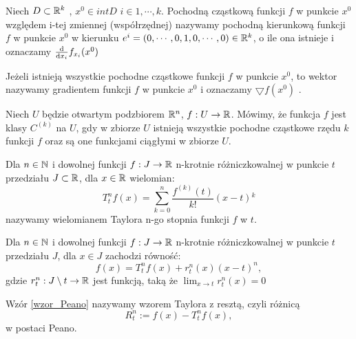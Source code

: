\documentclass[12pt,a4paper]{report}
\begin{document}
\begin{definition}
Niech $D \subset \mathbb{R}^k$ , $x^0 \in intD$ $ i \in {1,\cdots,k}$. Pochodną cząstkową funkcji $f$ w punkcie $x^0$ względem i-tej zmiennej (współrzędnej)  nazywamy pochodną kierunkową funkcji $f$ w punkcie $x^0$ w kierunku $e^i = (0, \cdots, 0, 1, 0, \cdots, 0) \in \mathbb{R}^k$, o ile ona istnieje i oznaczamy $\frac{\mathrm{d} {} }{\mathrm{d}{x_i}}f_{x_{i}}(x^0) $
\end{definition}

\begin{definition}
Jeżeli istnieją wszystkie pochodne cząstkowe funkcji $f$ w punkcie $x^0$, to wektor 
\begin{equation}
[\ddx{x_1}f_{x_{1}}(x_0), \cdots, \ddx{x_k}f_{x_{k}}(x_0)]
\end{equation}
 nazywamy gradientem funkcji $f$ w punkcie $x^0$ i oznaczamy $\bigtriangledown f(x^0)$ .
\end{definition}

\begin{definition}[klasa $C^{(k)}$]
Niech $U$ będzie otwartym podzbiorem $ \mathbb{R}^n $, $ f: U \to \mathbb{R} $. Mówimy, że funkcja $f$ jest klasy $C^{(k)}$ na $U$,  gdy w zbiorze $U$ istnieją wszystkie pochodne cząstkowe rzędu $k$ funkcji $f$ oraz są one funkcjami ciągłymi w zbiorze $U$. 
\end{definition}

\begin{definition}
Dla $ n \in \mathbb{N} $ i dowolnej funkcji $ f: J \to \mathbb{R} $ n-krotnie różniczkowalnej w punkcie $t$ przedziału $ J \subset \mathbb{R} $, dla $x \in \mathbb{R} $  wielomian: 
\begin{equation}
T_{t}^{n}f(x) = \sum_{k=0}^{n} \frac{f^{(k)}(t)}{k!} (x-t){^k}  
\end{equation}
nazywamy wielomianem Taylora n-go stopnia funkcji $f$ w $t$.
\end{definition}

\begin{theorem} \label{wzor_Peano}
Dla $n \in \mathbb{N}$ i dowolnej funkcji $ f: J \to \mathbb{R} $ n-krotnie różniczkowalnej w punkcie $t$ przedziału $J$, dla $x \in J$ zachodzi równość:
\begin{equation}
f(x) = T_{t}^{n}f(x) + r_{t}^{n}(x)(x-t)^n ,
\end{equation}
gdzie $r_{t}^{n} : J \setminus t \to \mathbb{R} $ jest funkcją, taką że $ \lim_{x \to t} r_{t}^{n}(x) = 0 $
\end{theorem}
\begin{definition}
Wzór \ref{wzor_Peano} nazywamy wzorem Taylora z resztą, czyli różnicą 
$$
R_{t}^{n} := f(x) - T_{t}^{n}f(x), 
$$
w postaci Peano. 
\end{definition}
\end{document}
